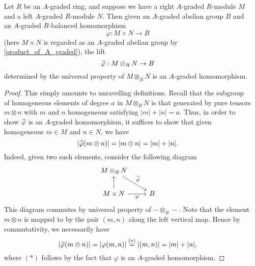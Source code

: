 \documentclass[../main.tex]{subfiles}
\begin{document}
\begin{lemma}\label{tensor_lift_of_A_graded_is_A_graded}
	Let $R$ be an $A$-graded ring, and suppose we have a right $A$-graded $R$-module $M$ and a left $A$-graded $R$-module $N$. Then given an $A$-graded abelian group $B$ and an $A$-graded $R$-balanced homomorphism
	\[\varphi:M\times N\to B\]
	(here $M\times N$ is regarded as an $A$-graded abelian group by \autoref{product_of_A_graded}), the lift
	\[\widetilde\varphi:M\otimes_RN\to B\]
	determined by the universal property of $M\otimes_RN$ is an $A$-graded homomorphism.
\end{lemma}
\begin{proof}
	This simply amounts to unravelling definitions. Recall that the subgroup of homogeneous elements of degree $a$ in $M\otimes_RN$ is that generated by pure tensors $m\otimes n$ with $m$ and $n$ homogeneous satisfying $|m|+|n|=a$. Thus, in order to show $\widetilde\varphi$ is an $A$-graded homomorphism, it suffices to show that given homogeneous $m\in M$ and $n\in N$, we have
	\[|\widetilde\varphi(m\otimes n)|=|m\otimes n|=|m|+|n|.\]
	Indeed, given two such elements, consider the following diagram
	\[\begin{tikzcd}
		{M\otimes_RN} \\
		{M\times N} & B
		\arrow[from=2-1, to=1-1]
		\arrow["\wt\varphi", from=1-1, to=2-2]
		\arrow["\varphi"', from=2-1, to=2-2]
	\end{tikzcd}\]
	This diagram commutes by universal property of $-\otimes_R-$. Note that the element $m\otimes n$ is mapped to by the pair $(m,n)$ along the left vertical map. Hence by commutativity, we necessarily have
	\[|\widetilde\varphi(m\otimes n)|=|\varphi(m,n)|\overset{(*)}=|(m,n)|=|m|+|n|,\]
	where $(*)$ follows by the fact that $\varphi$ is an $A$-graded homomorphism.
\end{proof}
\end{document}

